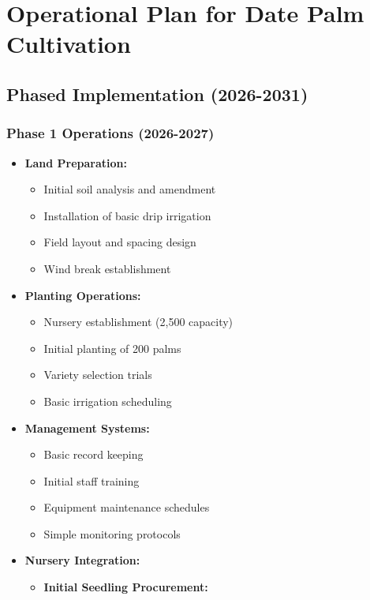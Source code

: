 \section{Operational Plan for Date Palm Cultivation}

\subsection{Phased Implementation (2026-2031)}

\subsubsection{Phase 1 Operations (2026-2027)}
\begin{itemize}
    \item \textbf{Land Preparation:}
    \begin{itemize}
        \item Initial soil analysis and amendment
        \item Installation of basic drip irrigation
        \item Field layout and spacing design
        \item Wind break establishment
    \end{itemize}
    \item \textbf{Planting Operations:}
    \begin{itemize}
        \item Nursery establishment (2,500 capacity)
        \item Initial planting of 200 palms
        \item Variety selection trials
        \item Basic irrigation scheduling
    \end{itemize}
    \item \textbf{Management Systems:}
    \begin{itemize}
        \item Basic record keeping
        \item Initial staff training
        \item Equipment maintenance schedules
        \item Simple monitoring protocols
    \end{itemize}
    \item \textbf{Nursery Integration:} \label{sec:date_palm_nursery_integration}
    \begin{itemize}
        \item \textbf{Initial Seedling Procurement:}

\end{itemize}
\end{itemize}

